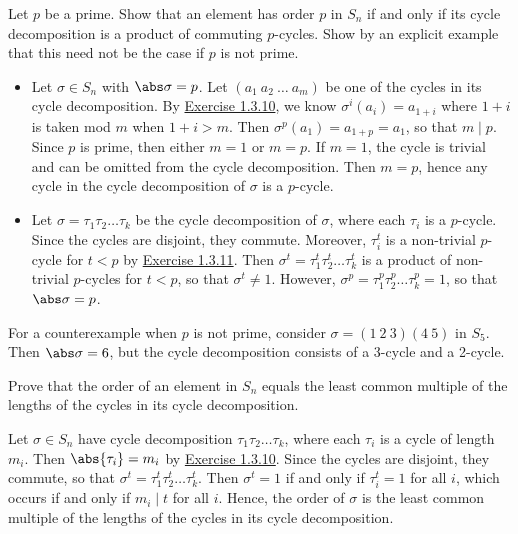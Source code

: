 \begin{exercise}\label{ex1.3.14}
    Let $p$ be a prime. Show that an element has order $p$ in $S_n$ if and only if its cycle decomposition is a product of commuting $p$-cycles. Show by an explicit example that this need not be the case if $p$ is not prime.
\end{exercise}

\begin{sol}
    \leavevmode
    \begin{itemize}
        \item [\rightimp] Let $\sigma \in S_n$ with $\abs\sigma = p$. Let $(a_1\ a_2\ \ldots\ a_m)$ be one of the cycles in its cycle decomposition. By \hyperref[ex1.3.10]{Exercise 1.3.10}, we know $\sigma^i(a_i) = a_{1 + i}$ where $1 + i$ is taken mod $m$ when $1 + i > m$. Then $\sigma^p(a_1) = a_{1 + p} = a_1$, so that $m \mid p$. Since $p$ is prime, then either $m = 1$ or $m = p$. If $m = 1$, the cycle is trivial and can be omitted from the cycle decomposition. Then $m = p$, hence any cycle in the cycle decomposition of $\sigma$ is a $p$-cycle.
        \item [\leftimp] Let $\sigma = \tau_1\tau_2 \ldots \tau_k$ be the cycle decomposition of $\sigma$, where each $\tau_i$ is a $p$-cycle. Since the cycles are disjoint, they commute. Moreover, $\tau_i^t$ is a non-trivial $p$-cycle for $t < p$ by \hyperref[ex1.3.11]{Exercise 1.3.11}. Then $\sigma^t = \tau_1^t\tau_2^t \ldots \tau_k^t$ is a product of non-trivial $p$-cycles for $t < p$, so that $\sigma^t \neq 1$. However, $\sigma^p = \tau_1^p\tau_2^p \ldots \tau_k^p = 1$, so that $\abs\sigma = p$.
    \end{itemize}
    For a counterexample when $p$ is not prime, consider $\sigma = (1\ 2\ 3)(4\ 5)$ in $S_5$. Then $\abs\sigma = 6$, but the cycle decomposition consists of a 3-cycle and a 2-cycle.
\end{sol}

\begin{exercise}\label{ex1.3.15}
    Prove that the order of an element in $S_n$ equals the least common multiple of the lengths of the cycles in its cycle decomposition.
\end{exercise}

\begin{sol}
    Let $\sigma \in S_n$ have cycle decomposition $\tau_1\tau_2 \ldots \tau_k$, where each $\tau_i$ is a cycle of length $m_i$. Then $\abs{\tau_i} = m_i$ by \hyperref[ex1.3.10]{Exercise 1.3.10}. Since the cycles are disjoint, they commute, so that $\sigma^t = \tau_1^t\tau_2^t \ldots \tau_k^t$. Then $\sigma^t = 1$ if and only if $\tau_i^t = 1$ for all $i$, which occurs if and only if $m_i \mid t$ for all $i$. Hence, the order of $\sigma$ is the least common multiple of the lengths of the cycles in its cycle decomposition.
\end{sol}

